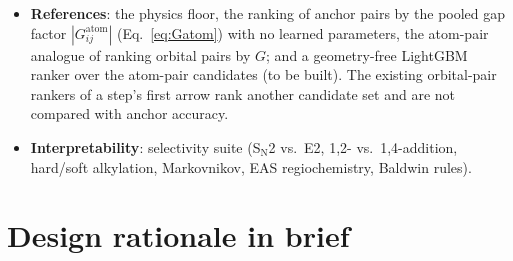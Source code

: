 \documentclass[11pt,a4paper]{article}
\begin{document}
\begin{itemize}[nosep]
\item \textbf{References}: the physics floor, the ranking of anchor pairs by the pooled gap factor $|G^{\mathrm{atom}}_{ij}|$ (Eq.~\eqref{eq:Gatom}) with no learned parameters, the atom-pair analogue of ranking orbital pairs by $G$; and a geometry-free LightGBM ranker over the atom-pair candidates (to be built). The existing orbital-pair rankers of a step's first arrow rank another candidate set and are not compared with anchor accuracy.
\item \textbf{Interpretability}: selectivity suite (S$_\mathrm{N}$2 vs.\ E2, 1,2- vs.\ 1,4-addition, hard/soft alkylation, Markovnikov, EAS regiochemistry, Baldwin rules).
\end{itemize}

\section{Design rationale in brief}
\end{document}
